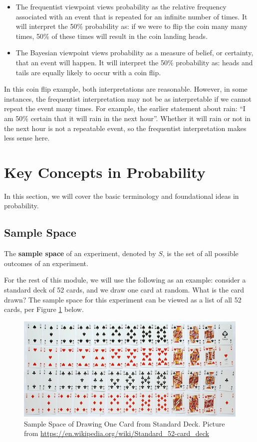 \documentclass[
]{book}
\begin{document}
\begin{itemize}
\item
  The frequentist viewpoint views probability as the relative frequency associated with an event that is repeated for an infinite number of times. It will interpret the 50\% probability as: if we were to flip the coin many many times, 50\% of these times will result in the coin landing heads.
\item
  The Bayesian viewpoint views probability as a measure of belief, or certainty, that an event will happen. It will interpret the 50\% probability as: heads and tails are equally likely to occur with a coin flip.
\end{itemize}

In this coin flip example, both interpretations are reasonable. However, in some instances, the frequentist interpretation may not be as interpretable if we cannot repeat the event many times. For example, the earlier statement about rain: ``I am 50\% certain that it will rain in the next hour''. Whether it will rain or not in the next hour is not a repeatable event, so the frequentist interpretation makes less sense here.

\section{Key Concepts in Probability}\label{key-concepts-in-probability}

In this section, we will cover the basic terminology and foundational ideas in probability.

\subsection{Sample Space}\label{sample-space}

The \textbf{sample space} of an experiment, denoted by \(S\), is the set of all possible outcomes of an experiment.

For the rest of this module, we will use the following as an example: consider a standard deck of 52 cards, and we draw one card at random. What is the card drawn? The sample space for this experiment can be viewed as a list of all 52 cards, per Figure \ref{fig:cards} below.

\begin{figure}
\centering
\includegraphics{images/02-cards.jpg}
\caption{\label{fig:cards}Sample Space of Drawing One Card from Standard Deck. Picture from \url{https://en.wikipedia.org/wiki/Standard_52-card_deck}}
\end{figure}
\end{document}

